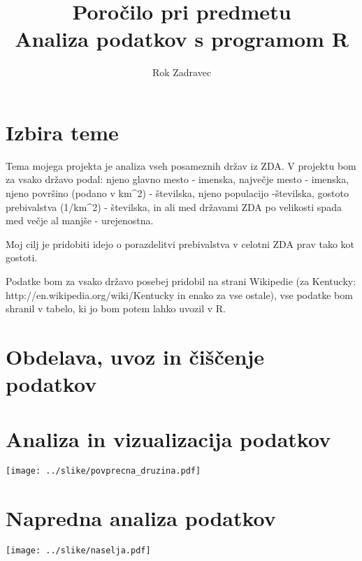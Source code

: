 \documentclass[11pt,a4paper]{article}
\begin{document}
\title{Poročilo pri predmetu \\
Analiza podatkov s programom R}
\author{Rok Zadravec}
\maketitle

\section{Izbira teme}

Tema mojega projekta je analiza vseh posameznih držav iz ZDA. V projektu bom za vsako državo podal: 
njeno glavno mesto - imenska, največje mesto - imenska, njeno površino (podano v km^2) - številska, 
njeno populacijo -številska, gostoto prebivalstva (1/km^2) - številska, 
in ali med državami ZDA po velikosti spada med večje al manjše - urejenostna.

Moj cilj je pridobiti idejo o porazdelitvi prebivalstva v celotni ZDA prav tako kot gostoti.

Podatke bom za vsako državo posebej pridobil na strani Wikipedie 
(za Kentucky: http://en.wikipedia.org/wiki/Kentucky in enako za vse ostale), vse podatke bom shranil v tabelo,
ki jo bom potem lahko uvozil v R.

\section{Obdelava, uvoz in čiščenje podatkov}

\section{Analiza in vizualizacija podatkov}

\texttt{[image: ../slike/povprecna\_druzina.pdf]}

\section{Napredna analiza podatkov}

\texttt{[image: ../slike/naselja.pdf]}
\end{document}
